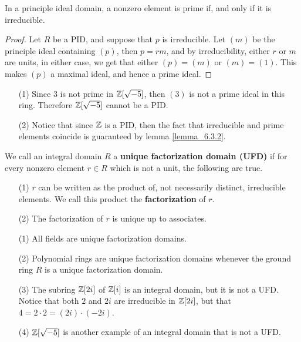 \begin{lemma}\label{lemma_6.3.2}
  In a principle ideal domain, a nonzero element is prime if, and only if it
  is irreducible.
\end{lemma}
\begin{proof}
  Let $R$ be a PID, and suppose that $p$ is irreducible. Let $(m)$ be the
  principle ideal containing $(p)$, then $p=rm$, and by irreducibility, either
  $r$ or $m$ are units, in either case, we get that either $(p)=(m)$ or
  $(m)=(1)$. This makes $(p)$ a maximal ideal, and hence a prime ideal.
\end{proof}

\begin{example}\label{example_6.7}
  \begin{enumerate}
    \item[(1)] Since $3$ is not prime in  $\mathbb{Z}[\sqrt{-5}]$, then $(3)$ is not
      a prime ideal in this ring. Therefore $\mathbb{Z}[\sqrt{-5}]$ cannot be a
      PID.

    \item[(2)] Notice that since $\mathbb{Z}$ is a PID, then the fact that
      irreducible and prime elements coincide is guaranteed by lemma
      \ref{lemma_6.3.2}.
  \end{enumerate}
\end{example}

\begin{definition}
  We call an integral domain $R$ a  \textbf{unique factorization domain (UFD)}
  if for every nonzero element $r \in R$ which is not a unit, the following
  are true.
  \begin{enumerate}
    \item[(1)] $r$ can be written as the product of, not necessarily distinct,
      irreducible elements. We call this product the
      \textbf{factorization} of $r$.

    \item[(2)] The factorization of $r$ is unique up to associates.
  \end{enumerate}
\end{definition}

\begin{example}\label{example_6.8}
  \begin{enumerate}
    \item[(1)] All fields are unique factorization domains.

    \item[(2)] Polynomial rings are unique factorization domains whenever
      the ground ring $R$ is a unique factorization domain.

    \item[(3)] The subring $\mathbb{Z}[2i]$ of $\mathbb{Z}[i]$ is an integral domain, but it
      is not a UFD. Notice that both $2$ and  $2i$ are irreducible in
      $\mathbb{Z}[2i]$, but that $4=2 \cdot 2=(2i) \cdot (-2i)$.

    \item[(4)] $\mathbb{Z}[\sqrt{-5}]$ is another example of an integral domain that
      is not a UFD.
  \end{enumerate}
\end{example}


